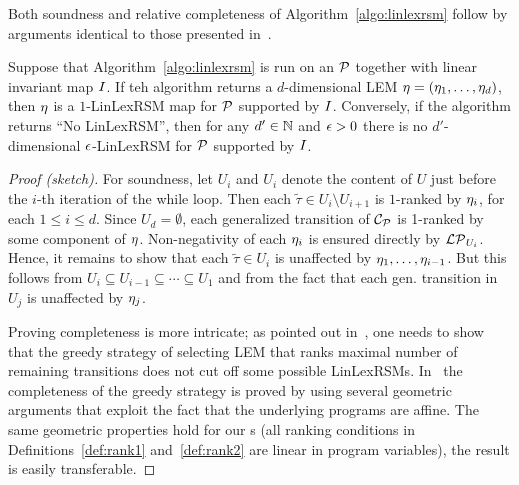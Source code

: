 Both soundness and relative completeness of Algorithm~\ref{algo:linlexrsm} follow by arguments identical to those presented in~\cite{xxx}. 
\begin{theorem}
	Suppose that Algorithm~\ref{algo:linlexrsm} is run on an \APP{} $\mathcal{P}$ together with linear invariant map $I$. If teh algorithm returns a $d$-dimensional LEM $\mathbf{\eta}=(\eta_1,\dots,\eta_d)$, then $\mathbf{\eta}$ is a $1$-LinLexRSM map for $\mathcal{P}$ supported by $I$. Conversely, if the algorithm returns ``No LinLexRSM'', then for any $d'\in \mathbb{N}$ and $\epsilon>0$ there is no $d'$-dimensional $\epsilon$-LinLexRSM for $\mathcal{P}$  supported by $I$.
\end{theorem}
\begin{proof}[Proof (sketch)]
For soundness, let $U_i$ and $U_{i}$ denote the content of $U$ just before the $i$-th iteration of the while loop. Then each $\tilde{\tau}\in U_{i}\setminus U_{i+1}$ is $1$-ranked by $\eta_i$, for each $1\leq i \leq d$. Since $U_{d}=\emptyset$, each generalized transition of $\mathcal{C}_{\mathcal{P}}$ is 1-ranked by some component of $\mathbf{\eta}$. Non-negativity of each $\eta_i$ is ensured directly by $\mathcal{LP}_{U_i}$. Hence, it remains to show that each $\tilde{\tau}\in U_i$ is unaffected by $\eta_1,\dots,\eta_{i-1}$. But this follows from $U_i \subseteq U_{i-1}\subseteq \cdots\subseteq U_1$ and from the fact that each gen. transition in $U_j$ is unaffected by $\eta_j$.

Proving completeness is more intricate; as pointed out in~\cite{xxx}, one needs to show that the greedy strategy of selecting LEM that ranks maximal number of remaining transitions does not cut off some possible LinLexRSMs. In~\cite{xxx} the completeness of the greedy strategy is proved by using several geometric arguments that exploit the fact that the underlying programs are affine. The same geometric properties hold for our \APP{}s (all ranking conditions in Definitions~\ref{def:rank1} and~\ref{def:rank2} are linear in program variables), the result is easily transferable.
\end{proof}

\